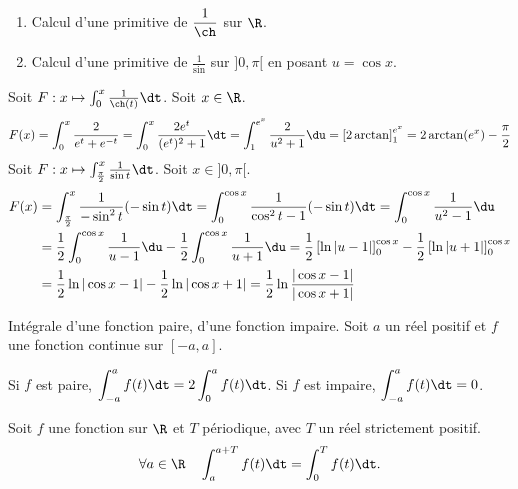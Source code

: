 \documentclass[11pt]{article}
\begin{document}
\begin{ex}{}{}
    \begin{enumerate}
        \item Calcul d'une primitive de $\displaystyle\frac{1}{\ch}$ sur $\R$.
        \item Calcul d'une primitive de $\displaystyle\frac{1}{\sin}$ sur $]0,\pi[$ en posant $u=\cos x$.
    \end{enumerate}
    \tcblower
     Soit $F:x\mapsto\int_0^x\frac{1}{\ch(t)}\dt$. Soit $x\in \R$.
    \begin{equation*}
        F(x)=\int_0^x\frac{2}{e^t+e^{-t}}=\int_0^x\frac{2e^t}{(e^t)^2+1}\dt=\int_1^{e^x}\frac{2}{u^2+1}\du=\left[ 2\arctan \right]_1^{e^x}=2\arctan(e^x)-\frac{\pi}{2}
    \end{equation*}
     Soit $F:x\mapsto\int_\frac{\pi}{2}^x\frac{1}{\sin t}\dt$. Soit $x\in]0,\pi[$.
    \begin{align*}
        F(x) &= \int_\frac{\pi}{2}^x\frac{1}{-\sin^2t}(-\sin t)\dt=\int_0^{\cos x}\frac{1}{\cos^2t-1}(-\sin t)\dt=\int_0^{\cos x}\frac{1}{u^2-1}\du\\
        &=\frac{1}{2}\int_0^{\cos x}\frac{1}{u-1}\du-\frac{1}{2}\int_0^{\cos x}\frac{1}{u+1}\du=\frac{1}{2}\left[ \ln |u-1| \right]_0^{\cos x}-\frac{1}{2}\left[ \ln|u+1| \right]_0^{\cos x}\\
        &= \frac{1}{2}\ln|\cos x - 1|-\frac{1}{2}\ln|\cos x + 1|  = \frac{1}{2}\ln\frac{|\cos x - 1|}{|\cos x + 1|}
    \end{align*}
\end{ex}

\begin{corr}{Intégrale d'une fonction paire, d'une fonction impaire.}{}
    Soit $a$ un réel positif et $f$ une fonction continue sur $[-a,a]$.
    \begin{center}
        Si $f$ est paire, $\displaystyle\int_{-a}^af(t)\dt=2\int_0^af(t)\dt$. \qquad Si $f$ est impaire, $\displaystyle\int_{-a}^af(t)\dt=0$.
    \end{center}
\end{corr}

\begin{corr}{}{}
    Soit $f$ une fonction sur $\R$ et $T$ périodique, avec $T$ un réel strictement positif.
    \begin{equation*}
        \forall a \in \R \quad \int_a^{a+T}f(t)\dt=\int_0^Tf(t)\dt.
    \end{equation*}
\end{corr}
\end{document}
